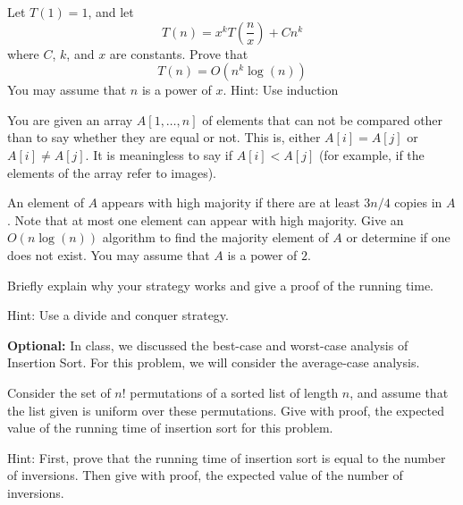 \documentclass[11pt,addpoints,answers]{exam}
\newcommand{\1}{\mathbf{1}}
\begin{document}
\begin{questions}
  \question[5] Let $T(1) = 1$, and let
\[
T(n) = x^kT\left(\frac{n}{x}\right)+C n^k
\]
where $C$, $k$, and $x$ are constants.
Prove that
\[
T(n) = O(n^k \log(n))
\]
You may assume that $n$ is a power of $x$.
Hint: Use induction

\begin{solution}
  \end{solution}
    
\question[5] You are given an array $A[1, \ldots, n]$ of elements that can not be compared other than to say whether they are equal or not. This is, either $A[i] = A[j]$ or $A[i] \neq A[j]$. 
It is meaningless to say if $A[i] < A[j]$ (for example, if the elements of the array refer to images).

An element of $A$ appears with high majority if there are at least $3n/4$ copies in $A$.
Note that at most one element can appear with high majority.
Give an $O(n\log(n))$ algorithm to find the majority element of $A$ or determine if one does not exist.
You may assume that $A$ is a power of $2$.

Briefly explain why your strategy works and give a proof of the running time.

Hint: Use a divide and conquer strategy.

  \begin{solution}
  \end{solution}


\question[5] \textbf{Optional:} In class, we discussed the best-case and worst-case analysis of Insertion Sort. For this problem, we will consider the average-case analysis.

Consider the set of $n!$ permutations of a sorted list of length $n$, and assume that the list given is uniform over these permutations.
Give with proof, the expected value of the running time of insertion sort for this problem.

Hint: First, prove that the running time of insertion sort is equal to the number of inversions. Then give with proof, the expected value of the number of inversions.

  \begin{solution}
				
  \end{solution}

\end{questions}
\end{document}
